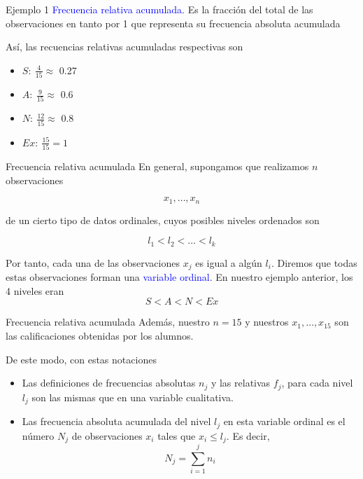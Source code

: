 \documentclass[
  ignorenonframetext,
  aspectratio=169]{beamer}
\providecommand{\tightlist}{%
  \setlength{\itemsep}{0pt}\setlength{\parskip}{0pt}}
\newcommand\blue[1]{\textcolor{blue}{#1}}
\begin{document}
\begin{frame}{Ejemplo 1}
\label{ejemplo-1-3}
\blue{
Frecuencia relativa acumulada.
} Es la fracción del total de las observaciones en tanto por 1 que
representa su frecuencia absoluta acumulada

Así, las recuencias relativas acumuladas respectivas son

\begin{itemize}
\tightlist
\item
  \(S:\ \frac{4}{15} \approx\) 0.27
\item
  \(A:\ \frac{9}{15}\approx\) 0.6
\item
  \(N:\ \frac{12}{15}\approx\) 0.8
\item
  \(Ex:\ \frac{15}{15}=1\)
\end{itemize}
\end{frame}

\begin{frame}{Frecuencia relativa acumulada}
\label{frecuencia-relativa-acumulada}
En general, supongamos que realizamos \(n\) observaciones

\[x_1,\dots,x_n\]

de un cierto tipo de datos ordinales, cuyos posibles niveles ordenados
son

\[l_1<l_2<\dots<l_k\]

Por tanto, cada una de las observaciones \(x_j\) es igual a algún
\(l_i\). Diremos que todas estas observaciones forman una
\blue{variable ordinal}. En nuestro ejemplo anterior, los 4 niveles eran
\[S<A<N<Ex\]
\end{frame}

\begin{frame}{Frecuencia relativa acumulada}
\label{frecuencia-relativa-acumulada-1}
Además, nuestro \(n = 15\) y nuestros \(x_1,\dots,x_{15}\) son las
calificaciones obtenidas por los alumnos.

De este modo, con estas notaciones

\begin{itemize}
\tightlist
\item
  Las definiciones de frecuencias absolutas \(n_j\) y las relativas
  \(f_j\), para cada nivel \(l_j\) son las mismas que en una variable
  cualitativa.
\item
  Las frecuencia absoluta acumulada del nivel \(l_j\) en esta variable
  ordinal es el número \(N_j\) de observaciones \(x_i\) tales que
  \(x_i\le l_j\). Es decir, \[N_j=\sum_{i=1}^jn_i\]
\end{itemize}
\end{frame}
\end{document}
